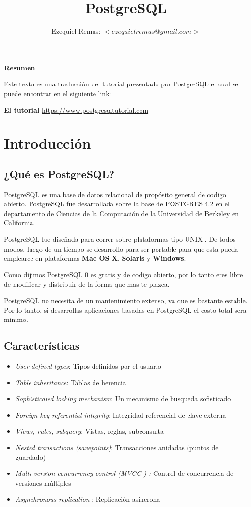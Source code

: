 \documentclass[10pt]{article}
\title{\bfseries \huge {PostgreSQL} }
\author{Ezequiel Remus: $<ezequielremus@gmail.com>$}
\date{}
\newcommand{\postgres}[1]{{\textcolor{R}{PostgreSQL} #1}}
\newcommand{\unix}[1]{{\textcolor{B}{UNIX} #1}}
\newcommand{\mvcc}[1]{{\textcolor{B}{MVCC} #1}}
\begin{document}
\renewcommand{\tablename}{Tabla}
\maketitle
\newpage

\textbf{Resumen}

Este texto es una traducción del tutorial presentado por \postgres{} el cual se puede encontrar en el siguiente link:

\textbf{El tutorial}
\url{https://www.postgresqltutorial.com}

\tableofcontents
\newpage


\section{Introducción}
\subsection{¿Qué es PostgreSQL?}
\postgres{} es una base de datos relacional de propósito general de codigo abierto. \postgres{} fue desarrollada sobre la base de POSTGRES 4.2 en el departamento de Ciencias de la Computación de la Universidad de Berkeley en California.

\postgres{} fue diseñada para correr sobre plataformas tipo \unix{}. De todos modos, luego de un tiempo se desarrollo para ser portable para que esta pueda emplearce en plataformas \textbf{Mac OS X}, \textbf{Solaris} y \textbf{Windows}. 

Como dijimos \postgres{0} es gratis y de codigo abierto, por lo tanto eres libre de modificar y distribuir de la forma que mas te plazca.

\postgres{} no necesita de un mantenimiento extenso, ya que es bastante estable. Por lo tanto, si desarrollas aplicaciones basadas en \postgres{} el costo total sera minimo.

\subsection{Características}
\begin{itemize}
\item \textit{User-defined types}: Tipos definidos por el usuario
\item \textit{Table inheritance}: Tablas de herencia
\item \textit{Sophisticated locking mechanism}: Un mecanismo de busqueda sofisticado
\item \textit{Foreign key referential integrity}: 
Integridad referencial de clave externa  
\item \textit{Views, rules, subquery}: 
Vistas, reglas, subconsulta
\item \textit{Nested transactions (savepoints)}: Transacciones anidadas (puntos de guardado)
\item \textit{Multi-version concurrency control (\mvcc{}) :} 
Control de concurrencia de versiones múltiples
\item \textit{Asynchronous replication} : Replicación asincrona
\end{itemize}
\end{document}
